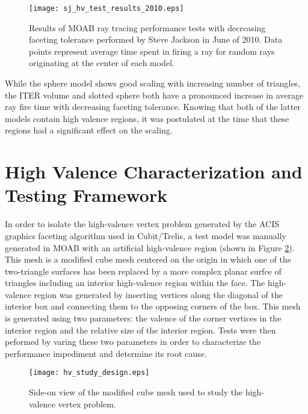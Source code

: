 \begin{figure}[H]
  \centering
  \begin{center}
    \texttt{[image: sj\_hv\_test\_results\_2010.eps]} \\
    \caption{Results of MOAB ray tracing performance tests with decreasing
      faceting tolerance performed by Steve Jackson in June of 2010. Data points
      represent average time spent in firing a ray for random rays
      originating at the center of each model.}
    \label{fig:sj_hv_test_results}
  \end{center}
\end{figure}

While the sphere model shows good scaling with increasing number of triangles,
the ITER volume and slotted sphere both have a pronounced increase in average
ray fire time with decreasing faceting tolerance. Knowing that both of the
latter models contain high valence regions, it was postulated at the time that
these regions had a significant effect on the scaling. 

\section{High Valence Characterization and Testing Framework}

In order to isolate the high-valence vertex problem generated by the ACIS
graphics faceting algorithm used in Cubit/Trelis, a test model was manually
generated in MOAB with an artificial high-valence region (shown in Figure
\ref{fig:hv_cube_design}). This mesh is a modified cube mesh centered on the
origin in which one of the two-triangle surfaces has been replaced by a more
complex planar surfce of triangles including an interior high-valence region
within the face. The high-valence region was generated by inserting vertices
along the diagonal of the interior box and connecting them to the opposing
corners of the box. This mesh is generated using two parameters: the valence of
the corner vertices in the interior region and the relative size of the interior
region. Tests were then peformed by varing these two parameters in order to
characterize the performance impediment and determine its root cause.

\begin{figure}[H]
  \centering
    \texttt{[image: hv\_study\_design.eps]}
    \caption{Side-on view of the modified cube mesh used to study the
      high-valence vertex problem.}
    \label{fig:hv_cube_design}
\end{figure}

